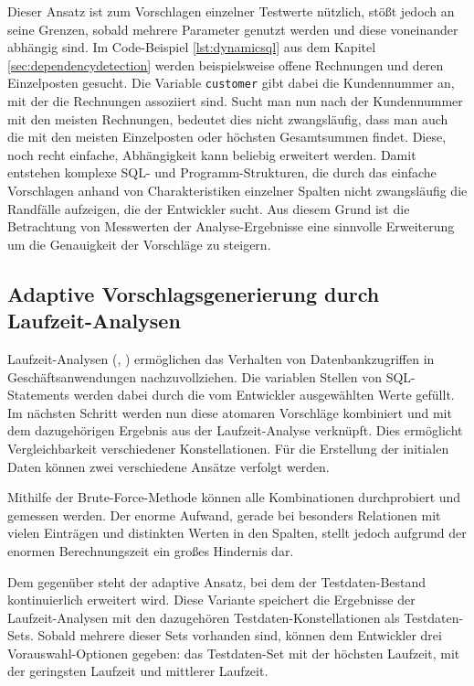 Dieser Ansatz ist zum Vorschlagen einzelner Testwerte nützlich, stößt jedoch an seine Grenzen, sobald mehrere Parameter genutzt werden und diese voneinander abhängig sind.
Im Code-Beispiel \ref{lst:dynamicsql} aus dem Kapitel \ref{sec:dependencydetection} werden beispielsweise offene Rechnungen und deren Einzelposten gesucht.
Die Variable \texttt{customer} gibt dabei die Kundennummer an, mit der die Rechnungen assoziiert sind.
Sucht man nun nach der Kundennummer mit den meisten Rechnungen, bedeutet dies nicht zwangsläufig, dass man auch die mit den meisten Einzelposten oder höchsten Gesamtsummen findet.
Diese, noch recht einfache, Abhängigkeit kann beliebig erweitert werden.
Damit entstehen komplexe SQL- und Programm-Strukturen, die durch das einfache Vorschlagen anhand von Charakteristiken einzelner Spalten nicht zwangsläufig die Randfälle aufzeigen, die der Entwickler sucht.
Aus diesem Grund ist die Betrachtung von Messwerten der Analyse-Ergebnisse eine sinnvolle Erweiterung um die Genauigkeit der Vorschläge zu steigern.

\subsection{Adaptive Vorschlagsgenerierung durch Laufzeit-Analysen}\label{chap:adaptive}
Laufzeit-Analysen (\cite{Exner2014}, \cite{Mues2014}) ermöglichen das Verhalten von Datenbankzugriffen in Geschäftsanwendungen nachzuvollziehen.
Die variablen Stellen von SQL-Statements werden dabei durch die vom Entwickler ausgewählten Werte gefüllt.
Im nächsten Schritt werden nun diese atomaren Vorschläge kombiniert und mit dem dazugehörigen Ergebnis aus der Laufzeit-Analyse verknüpft.
Dies ermöglicht Vergleichbarkeit verschiedener Konstellationen.
Für die Erstellung der initialen Daten können zwei verschiedene Ansätze verfolgt werden.

Mithilfe der Brute-Force-Methode können alle Kombinationen durchprobiert und gemessen werden.
Der enorme Aufwand, gerade bei besonders Relationen mit vielen Einträgen und distinkten Werten in den Spalten, stellt jedoch aufgrund der enormen Berechnungszeit ein großes Hindernis dar.

Dem gegenüber steht der adaptive Ansatz, bei dem der Testdaten-Bestand kontinuierlich erweitert wird.
Diese Variante speichert die Ergebnisse der Laufzeit-Analysen mit den dazugehören Testdaten-Konstellationen als Testdaten-Sets.
Sobald mehrere dieser Sets vorhanden sind, können dem Entwickler drei Vorauswahl-Optionen gegeben: das Testdaten-Set mit der höchsten Laufzeit, mit der geringsten Laufzeit und mittlerer Laufzeit.

